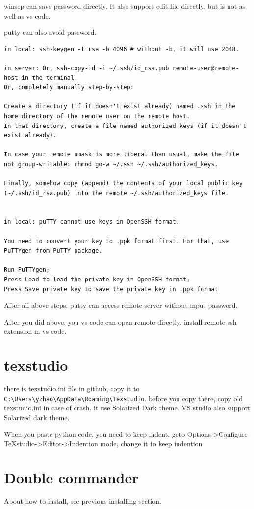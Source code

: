 \documentclass[paper=8.5in:11in, twoside, 12pt, pagesize=pdftex]{book}
\begin{document}
	winscp can save password directly. It also support edit file directly, but is not as well as vs code. 
	
	putty can also avoid password. 
\begin{verbatim}
in local: ssh-keygen -t rsa -b 4096 # without -b, it will use 2048.

in server: Or, ssh-copy-id -i ~/.ssh/id_rsa.pub remote-user@remote-host in the terminal. 
Or, completely manually step-by-step:

Create a directory (if it doesn't exist already) named .ssh in the home directory of the remote user on the remote host.
In that directory, create a file named authorized_keys (if it doesn't exist already).

In case your remote umask is more liberal than usual, make the file not group-writable: chmod go-w ~/.ssh ~/.ssh/authorized_keys.

Finally, somehow copy (append) the contents of your local public key (~/.ssh/id_rsa.pub) into the remote ~/.ssh/authorized_keys file.


in local: puTTY cannot use keys in OpenSSH format.

You need to convert your key to .ppk format first. For that, use PuTTYgen from PuTTY package.

Run PuTTYgen;
Press Load to load the private key in OpenSSH format;
Press Save private key to save the private key in .ppk format
\end{verbatim}
	After all above steps, putty can access remote server without input password.  

	After you did above, you vs code can open remote directly.  install remote-ssh extension in vs code.

	 
\section{texstudio}
there is texstudio.ini file in github, copy it to \verb|C:\Users\yzhao\AppData\Roaming\texstudio|. before you copy there, copy old texstudio.ini in case of crash. it use Solarized Dark theme. VS studio also support Solarized dark theme. 

When you paste python code, you need to keep indent, goto Options->Configure TeXstudio->Editor->Indention mode, change it to keep indention. 

\section{Double commander}
 About how to install, see previous installing section.
	
\end{document}
